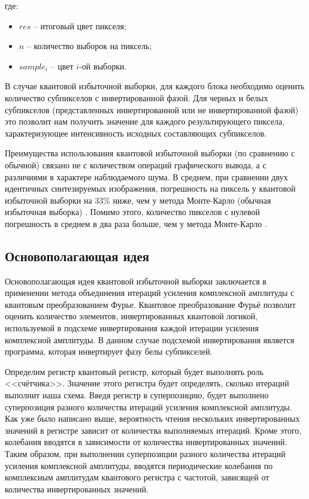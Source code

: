 где:

\begin{itemize}
	\item $res$ -- итоговый цвет пикселя;
	\item $n$ -- количество выборок на пиксель;
	\item $sample_{i}$ -- цвет $i$-ой выборки.
\end{itemize}

В случае квантовой избыточной выборки, для каждого блока необходимо оценить количество субпикселов с инвертированной фазой. Для черных и белых субпикселов (представленных инвертированной или не инвертированной фазой) это позволит нам получить значение для каждого результирующего пиксела, характеризующее интенсивность исходных составляющих субпикселов.

Преимущества использования квантовой избыточной выборки (по сравнению с обычной) связано не с количеством операций графического вывода, а с различиями в характере наблюдаемого шума. В среднем, при сравнении двух идентичных синтезируемых изображения, погрешность на пиксель у квантовой избыточной выборки на 33\% ниже, чем у метода Монте-Карло (обычная избыточная выборка) \cite{PQC-prcnt}. Помимо этого, количество пикселов с нулевой погрешность в среднем в два раза больше, чем у метода Монте-Карло \cite{PQC-prcnt}.

\subsection{Основополагающая идея}

Основополагающая идея квантовой избыточной выборки заключается в применении метода объединения итераций усиления комплексной амплитуды с квантовым преобразованием Фурье. Квантовое преобразование Фурьё позволит оценить количество элементов, инвертированных квантовой логикой, используемой в подсхеме инвертирования каждой итерации усиления комплексной амплитуды. В данном случае подсхемой инвертирования является программа, которая инвертирует фазу белы субпикселей.

Определим регистр квантовый регистр, который будет выполнять роль <<счётчика>>. Значение этого регистра будет определять, сколько итераций выполнит наша схема. Введя регистр в суперпозицию, будет выполнено суперпозиция разного количества итераций усиления комплексной амплитуды. Как уже было написано выше, вероятность чтения нескольких инвертированных значений в регистре зависит от количества выполняемых итераций. Кроме этого, колебания вводятся в зависимости от количества инвертированных значений. Таким образом, при выполнении суперпозиции разного количества итераций усиления комплексной амплитуды, вводятся периодические колебания по комплексным амплитудам квантового регистра с частотой, зависящей от количества инвертированных значений.

